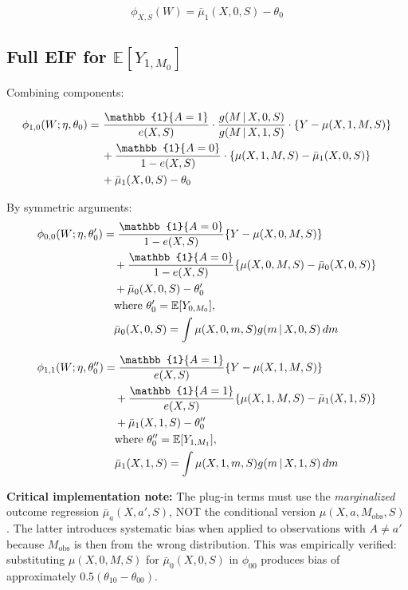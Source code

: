 \documentclass[11pt]{article}
\theoremstyle{plain}
\theoremstyle{definition}
\theoremstyle{remark}
\newcommand{\E}{\mathbb{E}}
\newcommand{\given}{\,|\,}
\newcommand{\ind}{\mathbb{1}}
\begin{document}
\begin{equation}
    \phi_{X,S}(W) = \bar\mu_1(X, 0, S) - \theta_0
\end{equation}

\subsection{Full EIF for $\E[Y_{1, M_0}]$}

Combining components:
\begin{tcolorbox-emulated}
\begin{align}
    \phi_{1,0}(W; \eta, \theta_0) =\,&\, \frac{\ind\{A = 1\}}{e(X, S)} \cdot \frac{g(M \given X, 0, S)}{g(M \given X, 1, S)} \cdot \{Y - \mu(X, 1, M, S)\} \notag \\
    &+ \frac{\ind\{A = 0\}}{1 - e(X, S)} \cdot \{\mu(X, 1, M, S) - \bar\mu_1(X, 0, S)\} \notag \\
    &+ \bar\mu_1(X, 0, S) - \theta_0
\end{align}
\end{tcolorbox-emulated}

By symmetric arguments:
\begin{align}
    \phi_{0,0}(W; \eta, \theta_0') &= \frac{\ind\{A=0\}}{1-e(X,S)}\{Y - \mu(X,0,M,S)\} \notag\\
    &\quad + \frac{\ind\{A=0\}}{1-e(X,S)}\{\mu(X,0,M,S) - \bar\mu_0(X,0,S)\} \notag\\
    &\quad + \bar\mu_0(X,0,S) - \theta_0' \notag\\
    &\quad \text{where } \theta_0' = \E[Y_{0,M_0}], \notag\\
    &\quad \bar\mu_0(X,0,S) = \int \mu(X,0,m,S) g(m \given X,0,S)\,dm
\end{align}

\begin{align}
    \phi_{1,1}(W; \eta, \theta_0'') &= \frac{\ind\{A=1\}}{e(X,S)}\{Y - \mu(X,1,M,S)\} \notag\\
    &\quad + \frac{\ind\{A=1\}}{e(X,S)}\{\mu(X,1,M,S) - \bar\mu_1(X,1,S)\} \notag\\
    &\quad + \bar\mu_1(X,1,S) - \theta_0'' \notag\\
    &\quad \text{where } \theta_0'' = \E[Y_{1,M_1}], \notag\\
    &\quad \bar\mu_1(X,1,S) = \int \mu(X,1,m,S) g(m \given X,1,S)\,dm
\end{align}

\textbf{Critical implementation note:} The plug-in terms must use the \emph{marginalized} outcome regression $\bar\mu_a(X, a', S)$, NOT the conditional version $\mu(X, a, M_{\mathrm{obs}}, S)$. The latter introduces systematic bias when applied to observations with $A \neq a'$ because $M_{\mathrm{obs}}$ is then from the wrong distribution. This was empirically verified: substituting $\mu(X,0,M,S)$ for $\bar\mu_0(X,0,S)$ in $\phi_{00}$ produces bias of approximately $0.5(\theta_{10} - \theta_{00})$.
\end{document}
